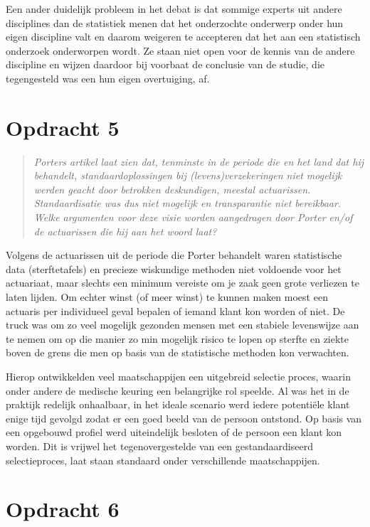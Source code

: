\documentclass[a4paper,11pt]{article}
\begin{document}
Een ander duidelijk probleem in het debat is dat sommige experts uit andere
disciplines dan de statistiek menen dat het onderzochte onderwerp onder hun
eigen discipline valt en daarom weigeren te accepteren dat het aan een
statistisch onderzoek onderworpen wordt. Ze staan niet open voor de kennis van
de andere discipline en wijzen daardoor bij voorbaat de conclusie van de
studie, die tegengesteld was een hun eigen overtuiging, af.


\section*{Opdracht 5}


\begin{quote}
\emph{Porters artikel laat zien dat, tenminste in de periode die en het land
  dat hij behandelt, standaardoplossingen bij (levens)verzekeringen niet
  mogelijk werden geacht door betrokken deskundigen, meestal
  actuarissen. Standaardisatie was dus niet mogelijk en transparantie niet
  bereikbaar. Welke argumenten voor deze visie worden aangedragen door Porter
  en/of de actuarissen die hij aan het woord laat?}
\end{quote}


Volgens de actuarissen uit de periode die Porter behandelt waren statistische
data (sterftetafels) en precieze wiskundige methoden niet voldoende voor het
actuariaat, maar slechts een minimum vereiste om je zaak geen grote verliezen
te laten lijden. Om echter winst (of meer winst) te kunnen maken moest een
actuaris per individueel geval bepalen of iemand klant kon worden of niet. De
truck was om zo veel mogelijk gezonden mensen met een stabiele levenswijze aan
te nemen om op die manier zo min mogelijk risico te lopen op sterfte en ziekte
boven de grens die men op basis van de statistische methoden kon verwachten.

Hierop ontwikkelden veel maatschappijen een uitgebreid selectie proces, waarin
onder andere de medische keuring een belangrijke rol speelde. Al was het in de
praktijk redelijk onhaalbaar, in het ideale scenario werd iedere potenti\"ele
klant enige tijd gevolgd zodat er een goed beeld van de persoon ontstond. Op
basis van een opgebouwd profiel werd uiteindelijk besloten of de persoon een
klant kon worden. Dit is vrijwel het tegenovergestelde van een
gestandaardiseerd selectieproces, laat staan standaard onder verschillende
maatschappijen.


\section*{Opdracht 6}
\end{document}

